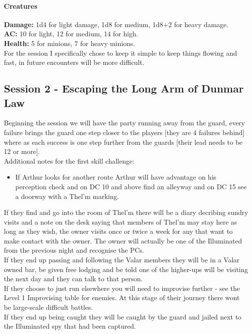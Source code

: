 \documentclass[10pt,twoside,twocolumn]{article}
\begin{document}
\paragraph{Creatures}

\textbf{Damage:} 1d4 for light damage, 1d8 for medium, 1d8+2 for heavy damage.\\
\textbf{AC:} 10 for light, 12 for medium, 14 for high.\\
\textbf{Health:} 5 for minions, 7 for heavy minions.\\

For the session I specifically chose to keep it simple to keep things flowing and fast, in future encounters will be more difficult. \\

\subsection{Session 2 - Escaping the Long Arm of Dunmar Law}

Beginning the session we will have the party running away from the guard, every failure brings the guard one step closer to the players [they are 4 failures behind] where as each success is one step further from the guards [their lead needs to be 12 or more]. \\

Additional notes for the first skill challenge:
\begin{itemize}
\item If Arthur looks for another route Arthur will have advantage on his perception check and on DC 10 and above find an alleyway and on DC 15 see a doorway with a Thel'm marking.
\end{itemize}

If they find and go into the room of Thel'm there will be a diary decribing sundry visits and a note on the desk saying that members of Thel'm may stay here as long as they wish, the owner visits once or twice a week for any that want to make contact with the owner. The owner will actually be one of the Illuminated from the previous night and recognise the PCs.\\

If they end up passing and following the Valar members they will be in a Valar owned bar, be given free lodging and be told one of the higher-ups will be visiting the next day and they can talk to that person. \\

If they choose to just run elsewhere you will need to improvise further - see the Level 1 Improvising table for enemies. At this stage of their journey there wont be large-scale difficult battles.\\

If they end up being caught they will be caught by the guard and jailed next to the Illuminated spy that had been captured.\\

\end{document}
